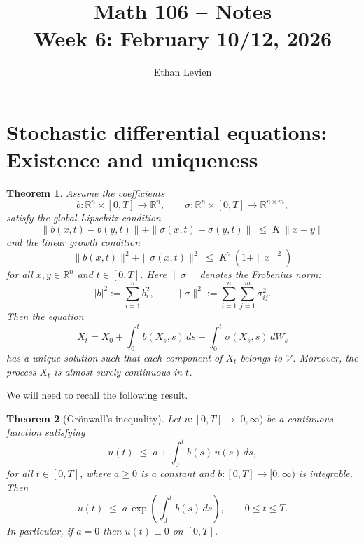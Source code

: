 \documentclass[11pt]{article}
\title{Math 106 -- Notes \\ Week 6: February 10/12, 2026}
\author{Ethan Levien}
\date{}
\newtheorem{theorem}{Theorem}
\begin{document}
\maketitle


\section*{Stochastic differential equations: Existence and uniqueness}
\begin{theorem}
Assume the coefficients 
\[
b:\mathbb{R}^n\times[0,T]\to\mathbb{R}^n,
\qquad
\sigma:\mathbb{R}^n\times[0,T]\to\mathbb{R}^{n\times m},
\]
satisfy the global Lipschitz condition
\begin{equation}
\|b(x,t)-b(y,t)\| + \|\sigma(x,t)-\sigma(y,t)\|
\;\le\; K\,\|x-y\|
\end{equation}
and the linear growth condition
\begin{equation}
\|b(x,t)\|^2 + \|\sigma(x,t)\|^2 
\;\le\; K^2\,(1+\|x\|^2)
\end{equation}
for all $x,y\in\mathbb{R}^n$ and $t\in[0,T]$.  
Here $\|\sigma\|$ denotes the Frobenius norm:
\[
|b|^2 := \sum_{i=1}^n b_i^2,
\qquad
\|\sigma\|^2 := \sum_{i=1}^n \sum_{j=1}^m \sigma_{ij}^2.
\]
Then the equation
\begin{equation}
X_t = X_0 + \int_0^t b(X_s,s)\,ds + \int_0^t \sigma(X_s,s)\,dW_s
\end{equation}
has a unique solution such that each component of $X_t$ belongs to $\mathcal{V}$.  
Moreover, the process $X_t$ is almost surely continuous in $t$.
\end{theorem}

We will need to recall the following result. 

\begin{theorem}[Gr\"onwall's inequality]
Let $u:[0,T]\to[0,\infty)$ be a continuous function satisfying
\begin{equation}
u(t)
\;\le\;
a
+
\int_0^t b(s)\,u(s)\,ds,
\end{equation}
for all $t\in[0,T]$, where $a\ge 0$ is a constant and $b:[0,T]\to[0,\infty)$ is integrable.  
Then
\begin{equation}
u(t)
\;\le\;
a\,\exp\!\left( \int_0^t b(s)\,ds \right),
\qquad 0 \le t \le T.
\end{equation}
In particular, if $a=0$ then $u(t)\equiv 0$ on $[0,T]$.
\end{theorem}
\end{document}
